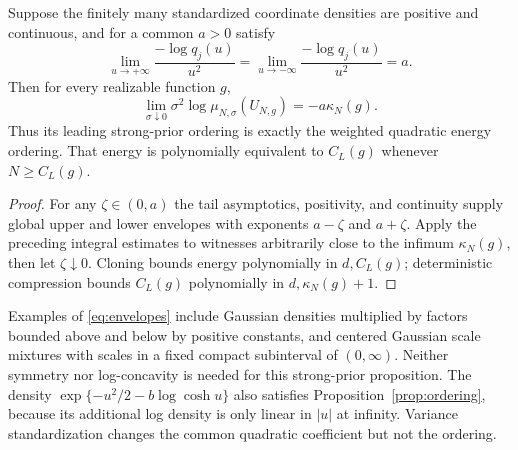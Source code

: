 \begin{proposition}\label{prop:ordering}
Suppose the finitely many standardized coordinate densities are positive
and continuous, and for a common $a>0$ satisfy
\[
 \lim_{u\to+\infty}\frac{-\log q_j(u)}{u^2}
 =\lim_{u\to-\infty}\frac{-\log q_j(u)}{u^2}=a.
\]
Then for every realizable function $g$,
\[
 \lim_{\sigma\downarrow0}\sigma^2
     \log\mu_{N,\sigma}(U_{N,g})=-a\kappa_N(g).
\]
Thus its leading strong-prior ordering is exactly the weighted quadratic
energy ordering. That energy is polynomially equivalent to $C_L(g)$
whenever $N\geq C_L(g)$.
\end{proposition}
\begin{proof}
For any $\zeta\in(0,a)$ the tail asymptotics, positivity, and continuity
supply global upper and lower envelopes with exponents $a-\zeta$ and
$a+\zeta$. Apply the preceding integral estimates to witnesses arbitrarily
close to the infimum $\kappa_N(g)$, then let $\zeta\downarrow0$.
Cloning bounds energy polynomially in $d,C_L(g)$; deterministic
compression bounds $C_L(g)$ polynomially in $d,\kappa_N(g)+1$.
\end{proof}

Examples of \eqref{eq:envelopes} include Gaussian densities multiplied by
factors bounded above and below by positive constants, and centered Gaussian scale mixtures with scales
in a fixed compact subinterval of $(0,\infty)$. Neither symmetry nor
log-concavity is needed for this strong-prior proposition. The density
$\exp\{-u^2/2-b\log\cosh u\}$ also satisfies
Proposition~\ref{prop:ordering}, because its additional log density is only
linear in $|u|$ at infinity. Variance standardization changes the common
quadratic coefficient but not the ordering.
